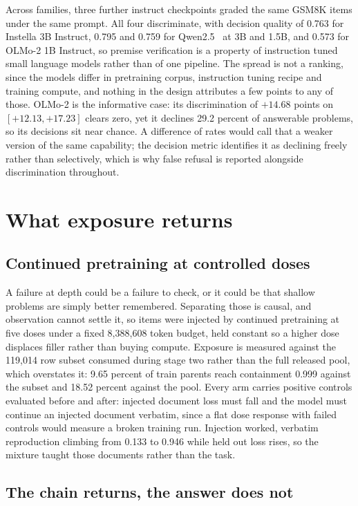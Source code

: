 \documentclass{article}
\begin{document}
Across families, three further instruct checkpoints graded the same GSM8K items under the
same prompt. All four discriminate, with decision quality of 0.763 for Instella 3B Instruct,
0.795 and 0.759 for Qwen2.5~\citep{qwen2025qwen25} at 3B and 1.5B, and 0.573 for
OLMo-2 1B Instruct, so premise
verification is a property of instruction tuned small language models rather than of one
pipeline. The spread is not a ranking, since the models differ in pretraining corpus,
instruction tuning recipe and training compute, and nothing in the design attributes a few
points to any of those. OLMo-2 is the informative case: its discrimination of $+14.68$ points
on $[+12.13, +17.23]$ clears zero, yet it declines 29.2 percent of answerable problems, so its
decisions sit near chance. A difference of rates would call that a weaker version of the same
capability; the decision metric identifies it as declining freely rather than selectively,
which is why false refusal is reported alongside discrimination throughout.

\section{What exposure returns}

\subsection{Continued pretraining at controlled doses}

A failure at depth could be a failure to check, or it could be that shallow problems are
simply better remembered. Separating those is causal, and observation cannot settle it, so
items were injected by continued pretraining at five doses under a fixed 8{,}388{,}608 token
budget, held constant so a higher dose displaces filler rather than buying compute. Exposure
is measured against the 119{,}014 row subset consumed during stage two rather than the full
released pool, which overstates it: 9.65 percent of train parents reach containment 0.999
against the subset and 18.52 percent against the pool. Every arm
carries positive controls evaluated before and after: injected document loss must fall and
the model must continue an injected document verbatim, since a flat dose response with failed
controls would measure a broken training run. Injection worked, verbatim reproduction
climbing from 0.133 to 0.946 while held out loss rises, so the mixture taught those documents
rather than the task.

\subsection{The chain returns, the answer does not}
\end{document}
